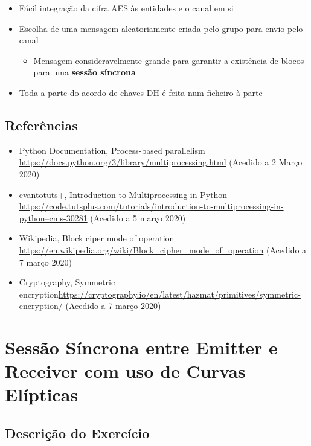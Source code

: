 \documentclass[12pt]{report}
\providecommand{\tightlist}{%
      \setlength{\itemsep}{0pt}\setlength{\parskip}{0pt}}
\begin{document}
\begin{itemize}
\tightlist
\item
  Fácil integração da cifra AES às entidades e o canal em si
\item
  Escolha de uma mensagem aleatoriamente criada pelo grupo para envio
  pelo canal

  \begin{itemize}
  \tightlist
  \item
    Mensagem consideravelmente grande para garantir a existência de
    blocos para uma \textbf{sessão síncrona}
  \end{itemize}
\item
  Toda a parte do acordo de chaves DH é feita num ficheiro à parte
\end{itemize}
\bigskip
    \hypertarget{referuxeancias}{%
\subsection{Referências}\label{referuxeancias}}

\begin{itemize}
\tightlist
\item
  Python Documentation, Process-based parallelism
  \url{https://docs.python.org/3/library/multiprocessing.html} (Acedido
  a 2 Março 2020)
\item
  evantotuts+, Introduction to Multiprocessing in Python
  \href{https://code.tutsplus.com/tutorials/introduction-to-multiprocessing-in-python--cms-30281}{https://code.tutsplus.com/tutorials/introduction-to-multiprocessing-in-python--cms-30281}
  (Acedido a 5 março 2020)
\item
  Wikipedia, Block ciper mode of operation
  \url{https://en.wikipedia.org/wiki/Block_cipher_mode_of_operation}
  (Acedido a 7 março 2020)
\item
  Cryptography, Symmetric
  encryption\url{https://cryptography.io/en/latest/hazmat/primitives/symmetric-encryption/}
  (Acedido a 7 março 2020)
\end{itemize}

\newpage
\section{Sessão Síncrona entre Emitter e Receiver com uso de Curvas
Elípticas}
\bigskip
\hypertarget{descriuxe7uxe3o-do-exercuxedcio}{%
\subsection{Descrição do
Exercício}\label{descriuxe7uxe3o-do-exercuxedcio}}
\end{document}
